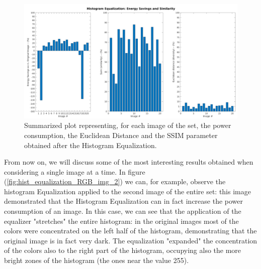\documentclass[a4paper]{article}
\begin{document}
            \begin{figure}[htp]
                \centering
                \includegraphics[width=0.8 \columnwidth]{./screenshots/HistEqOverall}
                \caption{
                        \label{fig:HistEqOverall}
                        Summarized plot representing, for each image of the set, the power consumption, the Euclidean Distance and the SSIM parameter obtained after the Histogram Equalization.
                }
            \end{figure}

            From now on, we will discuss some of the most interesting results obtained when considering a single image at a time.
            In figure (\ref{fig:hist_equalization_RGB_img_2}) we can, for example, observe the histogram Equalization applied to the second image of the entire set: this image demonstrated that the Histogram Equalization can in fact increase the power consumption of an image. In this case, we can see that the application of the equalizer "stretches" the entire histogram: in the original images most of the colors were concentrated on the left half of the histogram, demonstrating that the original image is in fact very dark. The equalization "expanded" the concentration of the colors also to the right part of the histogram, occupying also the more bright zones of the histogram (the ones near the value 255).
\end{document}

